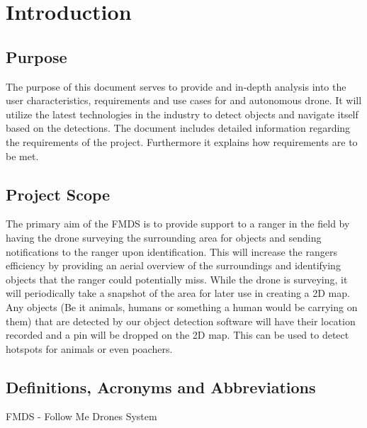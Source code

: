 \chapter{Introduction}

\section{Purpose}
The purpose of this document serves to provide and in-depth analysis into the user characteristics, requirements and use cases for and autonomous drone. 
It will utilize the latest technologies in the industry to detect objects and navigate itself based on the detections. 
The document includes detailed information regarding the requirements of the project.
Furthermore it explains how requirements are to be met.


\section{Project Scope}

The primary aim of the FMDS is to provide support to a ranger in the field by having the drone surveying the surrounding area for objects and sending notifications to the ranger upon identification. This will increase 
the rangers efficiency by providing an aerial overview of the surroundings and identifying objects that the 
ranger could potentially miss.
\newline
\newline
While the drone is surveying, it will periodically take a snapshot of the area for later use in creating a 2D map. 
Any objects (Be it animals, humans or something a human would be carrying on them) that are detected by our object detection
software will have their location recorded and a pin will be dropped on the 2D map. This can be used to detect hotspots for
animals or even poachers.

\section{Definitions, Acronyms and Abbreviations}

FMDS - Follow Me Drones System



